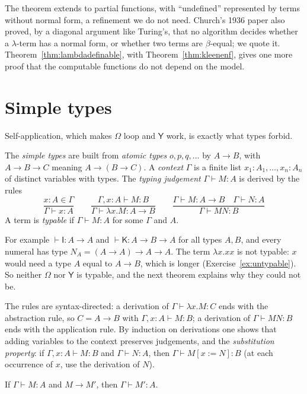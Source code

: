 The theorem extends to partial functions, with ``undefined'' represented by terms without normal form, a refinement we do not need. Church's 1936 paper also proved, by a diagonal argument like Turing's, that no algorithm decides whether a $\lambda$-term has a normal form, or whether two terms are $\beta$-equal; we quote it. Theorem~\ref{thm:lambdadefinable}, with Theorem~\ref{thm:kleenenf}, gives one more proof that the computable functions do not depend on the model.

\section{Simple types}\label{sec:types}

Self-application, which makes $\Omega$ loop and $\mathsf Y$ work, is exactly what types forbid.

\begin{definition}\label{def:types}
The \emph{simple types} are built from \emph{atomic types} $o,p,q,\dots$ by $A\to B$, with $A\to B\to C$ meaning $A\to(B\to C)$. A \emph{context} $\Gamma$ is a finite list $x_1:A_1,\dots,x_n:A_n$ of distinct variables with types. The \emph{typing judgement} $\Gamma\vdash M:A$ is derived by the rules
\[
\frac{x:A\in\Gamma}{\Gamma\vdash x:A}\qquad
\frac{\Gamma,x:A\vdash M:B}{\Gamma\vdash\lambda x.M:A\to B}\qquad
\frac{\Gamma\vdash M:A\to B\quad\Gamma\vdash N:A}{\Gamma\vdash MN:B}
\]
A term is \emph{typable} if $\Gamma\vdash M:A$ for some $\Gamma$ and $A$.
\end{definition}

For example $\vdash\mathsf I:A\to A$ and $\vdash\mathsf K:A\to B\to A$ for all types $A,B$, and every numeral has type $N_A=(A\to A)\to A\to A$. The term $\lambda x.xx$ is not typable: $x$ would need a type $A$ equal to $A\to B$, which is longer (Exercise~\ref{ex:untypable}). So neither $\Omega$ nor $\mathsf Y$ is typable, and the next theorem explains why they could not be.

The rules are syntax-directed: a derivation of $\Gamma\vdash\lambda x.M:C$ ends with the abstraction rule, so $C=A\to B$ with $\Gamma,x:A\vdash M:B$; a derivation of $\Gamma\vdash MN:B$ ends with the application rule. By induction on derivations one shows that adding variables to the context preserves judgements, and the \emph{substitution property}: if $\Gamma,x:A\vdash M:B$ and $\Gamma\vdash N:A$, then $\Gamma\vdash M[x:=N]:B$ (at each occurrence of $x$, use the derivation of $N$).

\begin{proposition}\label{prop:subjred}
If $\Gamma\vdash M:A$ and $M\to M'$, then $\Gamma\vdash M':A$.
\end{proposition}

